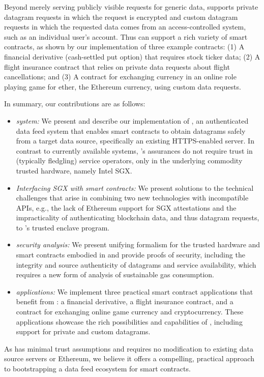 Beyond merely serving publicly visible requests for generic data, \tc supports private datagram requests in which the request is encrypted and custom datagram requests in which the requested data comes from an access-controlled system, such as an individual user's account. Thus \tc can support a rich variety of smart contracts, as shown by our implementation of three example contracts: (1) A financial derivative (cash-settled put option) that requires stock ticker data; (2) A flight insurance contract that relies on private data requests about flight cancellations; and (3) A contract for exchanging currency in an online role playing game for ether, the Ethereum currency, using custom data requests.

In summary, our contributions are as follows:

\vspace{-1mm}
\begin{itemize}
  \setlength{\itemsep}{2pt}
  \setlength{\parskip}{0pt}
  \setlength{\parsep}{0pt}

\item \emph{\tcs system:} We present and describe our implementation of \tc, an authenticated data feed system that enables smart contracts to obtain datagrams safely from a target data source, specifically an existing HTTPS-enabled server. In contrast to currently available systems, \tc's assurances do not require trust in (typically fledgling) service operators, only in the underlying commodity trusted hardware, namely Intel SGX. 

\item \emph{Interfacing SGX with smart contracts:} We present solutions to the technical challenges that arise in combining two new technologies with incompatible APIs, e.g., the lack of Ethereum support for SGX attestations and the impracticality of authenticating blockchain data, and thus datagram requests, to \tc's trusted enclave program. 

\item \emph{\tc security analysis:} We present unifying formalism for the trusted hardware and smart contracts embodied in \tc and provide proofs of security, including the integrity and source authenticity of datagrams and service availability, which requires a new form of analysis of sustainable gas consumption. 

\item \emph{\tc applications:} We implement three practical smart contract applications that benefit from \tc: a financial derivative, a flight insurance contract, and a contract for exchanging online game currency and cryptocurrency. These applications showcase the rich possibilities and capabilities of \tc, including support for private and custom datagrams. 

\end{itemize}

As \tc has minimal trust assumptions and requires no modification to existing data source servers or Ethereum, we believe it offers a compelling, practical approach to bootstrapping a data feed ecosystem for smart contracts.


